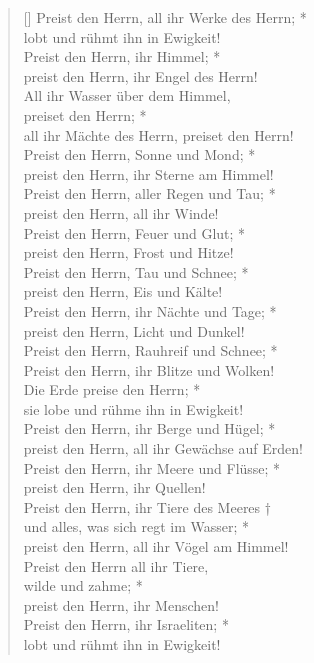 \begin{verse}[\versewidth]
Preist den Herrn, all ihr Werke des Herrn; *\\
lobt und rühmt ihn in Ewigkeit!\\
\vin Preist den Herrn, ihr Himmel; *\\
\vin preist den Herrn, ihr Engel des Herrn!\\
All ihr Wasser über dem Himmel,\\
preiset den Herrn; *\\
all ihr Mächte des Herrn, preiset den Herrn!\\
\vin Preist den Herrn, Sonne und Mond; *\\
\vin preist den Herrn, ihr Sterne am Himmel!\\
Preist den Herrn, aller Regen und Tau; *\\
preist den Herrn, all ihr Winde!\\
\vin Preist den Herrn, Feuer und Glut; *\\
\vin preist den Herrn, Frost und Hitze!\\
Preist den Herrn, Tau und Schnee; *\\
preist den Herrn, Eis und Kälte!\\
\vin Preist den Herrn, ihr Nächte und Tage; *\\
\vin preist den Herrn, Licht und Dunkel!\\
Preist den Herrn, Rauhreif und Schnee; *\\
Preist den Herrn, ihr Blitze und Wolken!\\
\vin Die Erde preise den Herrn; *\\
\vin sie lobe und rühme ihn in Ewigkeit!\\
Preist den Herrn, ihr Berge und Hügel; *\\
preist den Herrn, all ihr Gewächse auf Erden!\\
\vin Preist den Herrn, ihr Meere und Flüsse; *\\
\vin preist den Herrn, ihr Quellen!\\
Preist den Herrn, ihr Tiere des Meeres †\\
und alles, was sich regt im Wasser; *\\
preist den Herrn, all ihr Vögel am Himmel!\\
\vin Preist den Herrn all ihr Tiere,\\
\vin wilde und zahme; *\\
\vin preist den Herrn, ihr Menschen!\\
Preist den Herrn, ihr Israeliten; *\\
lobt und rühmt ihn in Ewigkeit!\\

\end{verse}
